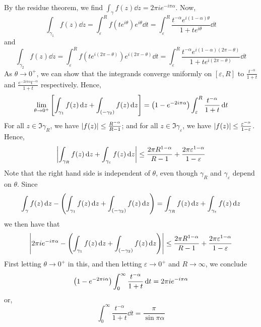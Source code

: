 \begin{example}
	By the residue theorem, we find \( \int_\gamma f(z) \dd{z} = 2\pi i e^{-i\pi \alpha} \).
	Now,
	\[ \int_{\gamma_1} f(z) \dd{z} = \int_\varepsilon^R f(te^{i\theta}) e^{i\theta} \dd{t} = \int_\varepsilon^R \frac{t^{-\alpha} e^{i(1-\alpha)\theta}}{1+te^{i\theta}} \dd{t} \]
	and
	\[ \int_{\gamma_2} f(z) \dd{z} = \int_\varepsilon^R f(te^{i(2\pi - \theta)}) e^{i(2\pi - \theta)} \dd{t} = \int_\varepsilon^R \frac{t^{-\alpha} e^{i(1-\alpha)(2\pi - \theta)}}{1 + te^{i(2\pi - \theta)}} \dd{t} \]
	As \( \theta \to 0^+ \), we can show that the integrands converge uniformly on \( [\varepsilon, R] \) to \( \frac{t^{-\alpha}}{1+t} \) and \( \frac{e^{-2i\pi \alpha}t^{-\alpha}}{1+t} \) respectively.
	Hence,
	\[ \lim_{\theta \to 0^+} \qty[ \int_{\gamma_1} f(z) \dd{z} + \int_{(-\gamma_2)} f(z) \dd{z} ] = \qty(1 - e^{-2i\pi \alpha}) \int_\varepsilon^R \frac{t^{-\alpha}}{1+t} \dd{t} \]
	For all \( z \in \Im \gamma_R \), we have \( \abs{f(z)} \leq \frac{R^{-\alpha}}{R-1} \); and for all \( z \in \Im \gamma_\varepsilon \), we have \( \abs{f(z)} \leq \frac{\varepsilon^{-\alpha}}{1-\varepsilon} \).
	Hence,
	\[ \abs{\int_{\gamma_R} f(z) \dd{z} + \int_{\gamma_\varepsilon} f(z) \dd{z}} \leq \frac{2\pi R^{1-\alpha}}{R - 1} + \frac{2\pi \varepsilon^{1-\alpha}}{1-\varepsilon} \]
	Note that the right hand side is independent of \( \theta \), even though \( \gamma_R \) and \( \gamma_\varepsilon \) depend on \( \theta \).
	Since
	\[ \int_\gamma f(z) \dd{z} - \qty(\int_{\gamma_1} f(z) \dd{z} + \int_{(-\gamma_2)} f(z) \dd{z}) = \int_{\gamma_R} f(z) \dd{z} + \int_{\gamma_\varepsilon} f(z) \dd{z} \]
	we then have that
	\[ \abs{2\pi i e^{-i\pi \alpha} - \qty(\int_{\gamma_1} f(z) \dd{z} + \int_{(-\gamma_2)} f(z) \dd{z}) } \leq \frac{2\pi R^{1-\alpha}}{R-1} + \frac{2\pi \varepsilon^{1-\alpha}}{1-\varepsilon} \]
	First letting \( \theta \to 0^+ \) in this, and then letting \( \varepsilon \to 0^+ \) and \( R \to \infty \), we conclude
	\[ \qty(1-e^{-2\pi i \alpha}) \int_0^\infty \frac{t^{-\alpha}}{1+t} \dd{t} = 2\pi i e^{-i\pi\alpha} \]
	or,
	\[ \int_0^\infty \frac{t^{-\alpha}}{1+t} \dd{t} = \frac{\pi}{\sin \pi \alpha} \]
\end{example}

